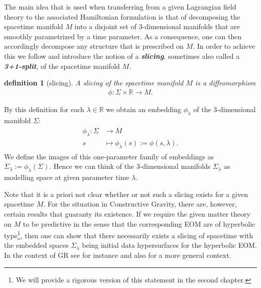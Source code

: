 \documentclass[a4paper,12pt, DIV=14, BCOR=5mm, twoside, headsepline, numbers=noenddot]{scrbook}
\newtheorem{definition}{definition}[section]
\begin{document}
The main idea that is used when transferring from a given Lagrangian field theory to the associated Hamiltonian formulation is that of decomposing the spacetime manifold $M$ into a disjoint set of 3-dimensional manifolds that are smoothly parametrized by a time parameter. As a consequence, one can then accordingly decompose any structure that is prescribed on $M$. In order to achieve this we follow \cite{2004math.ph..11032G} and introduce the notion of a \textit{\textbf{slicing}}, sometimes also called a \textit{\textbf{3+1-split}}, of the spacetime manifold $M$.
\begin{definition}[slicing]
A slicing of the spacetime manifold $M$ is a diffeomorphism 
\begin{align}
\phi : \Sigma \times \mathbb{R} \longrightarrow M.
\end{align}
\end{definition}
By this definition for each $\lambda \in \mathbb{R}$ we obtain an embedding $\phi_{\lambda}$ of the 3-dimensional manifold $\Sigma$:
\begin{align}
\begin{aligned}
\phi_{\lambda}: \Sigma &\longrightarrow M \\
s &\longmapsto \phi_{\lambda}(s) := \phi(s,\lambda).
\end{aligned}
\end{align}
We define the images of this one-parameter family of embeddings as $\Sigma_{\lambda} := \phi_{\lambda}(\Sigma)$. Hence we can think of the 3-dimensional manifolds $\Sigma_{\lambda}$ as modelling space at given parameter time $\lambda$.

Note that it is a priori not clear whether or not such a slicing exists for a given spacetime $M$. For the situation in Constructive Gravity, there are, however, certain results that guaranty its existence. If we require the given matter theory on $M$ to be predictive in the sense that the corresponding EOM are of hyperbolic type\footnote{We will provide a rigorous version of this statement in the second chapter. }, then one can show that there necessarily exists a slicing of spacetime with the embedded spaces $\Sigma_{\lambda}$ being initial data hypersurfaces for the hyperbolic EOM. In the context of GR see for instance \cite{2003CMaPh.243..461B} and also \cite{1996gere.conf...19G} for a more general context. 
\end{document}
